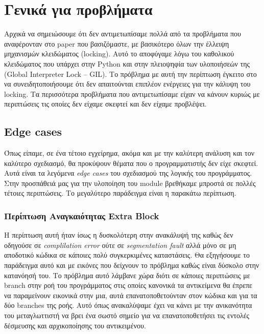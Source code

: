 
\section{Γενικά για προβλήματα}

Αρχικά να σημειώσουμε ότι δεν αντιμετωπίσαμε πολλά από τα προβλήματα που
αναφέρονταν στο paper\cite{stadler2014partial} που βασιζόμαστε, με βασικότερο
όλων την έλλειψη μηχανισμών κλειδώματος (locking). Αυτό το αποφύγαμε λόγω του
καθολικού κλειδώματος που υπάρχει στην Python και στην πλειοψηφία των
υλοποιήσεών της (Global Interpreter Lock – GIL). Το πρόβλημα με αυτή την
περίπτωση έγκειτο στο να συνειδητοποιήσουμε ότι δεν απαιτούνται επιπλέον
ενέργειες για την κάλυψη του locking.\cite{gil} Τα περισσότερα προβλήματα που
αντιμετωπίσαμε είχαν να κάνουν κυριώς με περιπτώσεις τις οποίες δεν είχαμε
σκεφτεί και δεν είχαμε προβλέψει.

\subsection{Edge cases}

Όπως είπαμε, σε ένα τέτοιο εγχείρημα, ακόμα και με την καλύτερη ανάλυση και τον
καλύτερο σχεδιασμό, θα προκύψουν θέματα που ο προγραμματιστής δεν είχε σκεφτεί.
Αυτά είναι τα λεγόμενα \textit{edge cases} του σχεδιασμού της λογικής του
προγράμματος. Στην προσπάθειά μας για την υλοποίηση του module βρεθήκαμε μπροστά
σε πολλές τέτοιες περιπτώσεις. Το μεγαλύτερο παράδειγμα είναι η παρακάτω
περίπτωση.

\subsubsection{Περίπτωση Αναγκαιότητας Extra Block}

Η περίπτωση αυτή ήταν ίσως η δυσκολότερη στην ανακάλυψή της καθώς δεν οδηγούσε
σε \textit{complilation error} ούτε σε \textit{segmentation fault} αλλά μόνο σε
μη αποδοτικό κώδικα σε κάποιες πολύ συγκερκιμένες καταστάσεις. Θα εξηγήσουμε το
παράδειγμα αυτό και με εικόνες που δείχνουν το πρόβλημα καθώς είναι δύσκολο στην
κατανόησή του. Το πρόβλημα αυτό λάμβανε χώρα διότι σε κάποιες περιπτώσεις με
branch στην ροή του προγράμματος στις οποίες κανονικά τα αντικείμενα θα έπρεπε
να παραμείνουν εικονικά στην μια, αυτά επανατοποθετούνταν στον κώδικα και για τα
δύο branches της ροής. Αυτό όπως ανακαλύψαμε έχει να κάνει με την ανικανότητα
του μεταγλωττιστή να βρει ένα σωστό σημείο για να επανατοποθετήσει τις εντολές
δέσμευσης και αρχικοποίησης του αντικειμένου.

